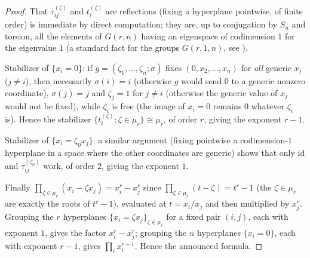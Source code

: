 \documentclass[11pt]{article}
\theoremstyle{remark}
\begin{document}
\begin{proof}
That $\tau_{ij}^{(\zeta)}$ and $t_i^{(\zeta)}$ are reflections (fixing a hyperplane pointwise, of finite order) is immediate by direct computation; they are, up to conjugation by $S_n$ and torsion, all the elements of $G(r,n)$ having an eigenspace of codimension $1$ for the eigenvalue $1$ (a standard fact for the groups $G(r,1,n)$, see \cite[Ch.~2]{LT}).

Stabilizer of $\{x_i=0\}$: if $g=(\zeta_1,\dots,\zeta_n;\sigma)$ fixes $(0,x_2,\dots,x_n)$ for \emph{all} generic $x_j$ ($j\ne i$), then necessarily $\sigma(i)=i$ (otherwise $g$ would send $0$ to a generic nonzero coordinate), $\sigma(j)=j$ and $\zeta_j=1$ for $j\ne i$ (otherwise the generic value of $x_j$ would not be fixed), while $\zeta_i$ is free (the image of $x_i=0$ remains $0$ whatever $\zeta_i$ is). Hence the stabilizer $\{t_i^{(\zeta)}:\zeta\in\mu_r\}\cong\mu_r$, of order $r$, giving the exponent $r-1$.

Stabilizer of $\{x_i=\zeta_0x_j\}$: a similar argument (fixing pointwise a codimension-$1$ hyperplane in a space where the other coordinates are generic) shows that only $\mathrm{id}$ and $\tau_{ij}^{(\zeta_0)}$ work, of order $2$, giving the exponent $1$.

Finally $\prod_{\zeta\in\mu_r}(x_i-\zeta x_j)=x_i^r-x_j^r$ since $\prod_{\zeta\in\mu_r}(t-\zeta)=t^r-1$ (the $\zeta\in\mu_r$ are exactly the roots of $t^r-1$), evaluated at $t=x_i/x_j$ and then multiplied by $x_j^r$. Grouping the $r$ hyperplanes $\{x_i=\zeta x_j\}_{\zeta\in\mu_r}$ for a fixed pair $(i,j)$, each with exponent $1$, gives the factor $x_i^r-x_j^r$; grouping the $n$ hyperplanes $\{x_i=0\}$, each with exponent $r-1$, gives $\prod_i x_i^{r-1}$. Hence the announced formula.
\end{proof}
\end{document}
